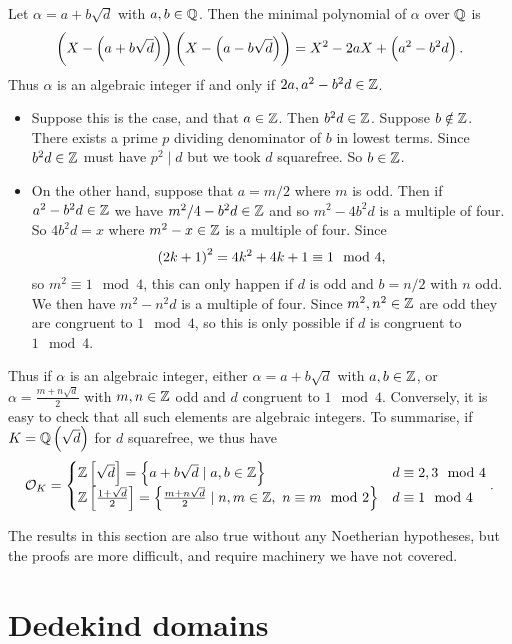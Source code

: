 Let $ \alpha = a + b\sqrt{d} $ with $ a, b \in \mathbb{Q} $. Then the minimal polynomial of $ \alpha $ over $ \mathbb{Q} $ is
$$ \br{X - \br{a + b\sqrt{d}}}\br{X - \br{a - b\sqrt{d}}} = X^2 - 2aX + \br{a^2 - b^2d}. $$
Thus $ \alpha $ is an algebraic integer if and only if $ 2a, a^2 - b^2d \in \mathbb{Z} $.
\begin{itemize}
\item Suppose this is the case, and that $ a \in \mathbb{Z} $. Then $ b^2d \in \mathbb{Z} $. Suppose $ b \notin \mathbb{Z} $. There exists a prime $ p $ dividing denominator of $ b $ in lowest terms. Since $ b^2d \in \mathbb{Z} $ must have $ p^2 \mid d $ but we took $ d $ squarefree. So $ b \in \mathbb{Z} $.
\item On the other hand, suppose that $ a = m / 2 $ where $ m $ is odd. Then if $ a^2 - b^2d \in \mathbb{Z} $ we have $ m^2 / 4 - b^2d \in \mathbb{Z} $ and so $ m^2 - 4b^2d $ is a multiple of four. So $ 4b^2d = x $ where $ m^2 - x \in \mathbb{Z} $ is a multiple of four. Since
$$ \br{2k + 1}^2 = 4k^2 + 4k + 1 \equiv 1 \mod 4, $$
so $ m^2 \equiv 1 \mod 4 $, this can only happen if $ d $ is odd and $ b = n / 2 $ with $ n $ odd. We then have $ m^2 - n^2d $ is a multiple of four. Since $ m^2, n^2 \in \mathbb{Z} $ are odd they are congruent to $ 1 \mod 4 $, so this is only possible if $ d $ is congruent to $ 1 \mod 4 $.
\end{itemize}
Thus if $ \alpha $ is an algebraic integer, either $ \alpha = a + b\sqrt{d} $ with $ a, b \in \mathbb{Z} $, or $ \alpha = \tfrac{m + n\sqrt{d}}{2} $ with $ m, n \in \mathbb{Z} $ odd and $ d $ congruent to $ 1 \mod 4 $. Conversely, it is easy to check that all such elements are algebraic integers. To summarise, if $ K = \Q\br{\sqrt{d}} $ for $ d $ squarefree, we thus have
$$ \OO_K =
\begin{cases}
\Z\sbr{\sqrt{d}} = \cbr{a + b\sqrt{d} \mid a, b \in \Z} & d \equiv 2, 3 \mod 4 \\
\Z\sbr{\tfrac{1 + \sqrt{d}}{2}} = \cbr{\tfrac{m + n\sqrt{d}}{2} \mid n, m \in \Z, \ n \equiv m \mod 2} & d \equiv 1 \mod 4
\end{cases}.
$$

\begin{note*}
The results in this section are also true without any Noetherian hypotheses, but the proofs are more difficult, and require machinery we have not covered.
\end{note*}

\pagebreak

\section{Dedekind domains}

